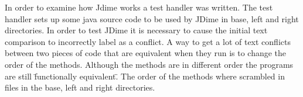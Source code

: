 In order to examine how Jdime works a test handler was written.
The test handler sets up some java source code to be used by JDime in base, left and right directories.
In order to test JDime it is necessary to cause the initial text comparison to incorrectly label as a conflict.
A way to get a lot of text conflicts between two pieces of code that are equivalent when they run is to change the order of the methods.
Although the methods are in different order the programs are still \"functionally equivalent\".
The order of the methods where scrambled in files in the base, left and right directories.





 







 
 


